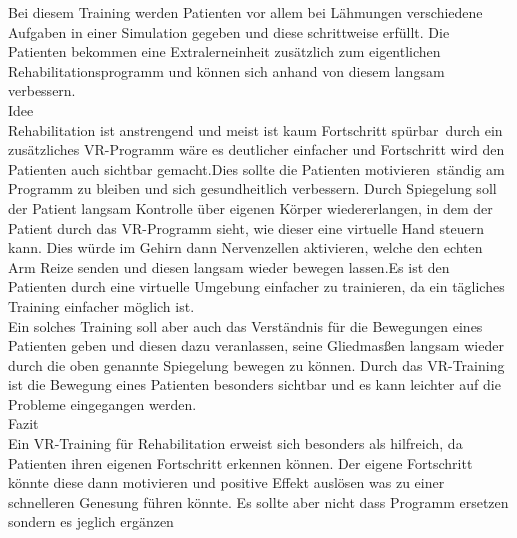 
Bei diesem Training werden Patienten vor allem bei Lähmungen verschiedene Aufgaben in einer Simulation gegeben und diese schrittweise erfüllt. Die Patienten bekommen eine Extralerneinheit zusätzlich zum eigentlichen Rehabilitationsprogramm und können sich anhand von diesem langsam verbessern.\\

Idee\\
Rehabilitation ist anstrengend und meist ist kaum Fortschritt spürbar durch ein zusätzliches VR-Programm wäre es deutlicher einfacher und Fortschritt wird den Patienten auch sichtbar gemacht.Dies sollte die Patienten motivieren ständig am Programm zu bleiben und sich gesundheitlich verbessern. Durch Spiegelung soll der Patient langsam Kontrolle über eigenen Körper wiedererlangen, in dem der Patient durch das VR-Programm sieht, wie dieser eine virtuelle Hand steuern kann. Dies würde im Gehirn dann Nervenzellen aktivieren, welche den echten Arm Reize senden und diesen langsam wieder bewegen lassen.Es ist den Patienten durch eine virtuelle Umgebung einfacher zu trainieren, da ein tägliches Training einfacher möglich ist. \cite{laver2017virtual} \\
Ein solches Training soll aber auch das Verständnis für die Bewegungen eines Patienten geben und diesen dazu veranlassen, seine Gliedmasßen langsam wieder durch die oben genannte Spiegelung bewegen zu können. Durch das VR-Training ist die Bewegung eines Patienten besonders sichtbar und es kann leichter auf die Probleme eingegangen werden. \cite{sveistrup2004motor} \\

Fazit\\
Ein VR-Training für Rehabilitation erweist sich besonders als hilfreich, da Patienten ihren eigenen Fortschritt erkennen können. Der eigene Fortschritt könnte diese dann motivieren und positive Effekt auslösen was zu einer schnelleren Genesung führen könnte. Es sollte aber nicht dass Programm ersetzen sondern es jeglich ergänzen


